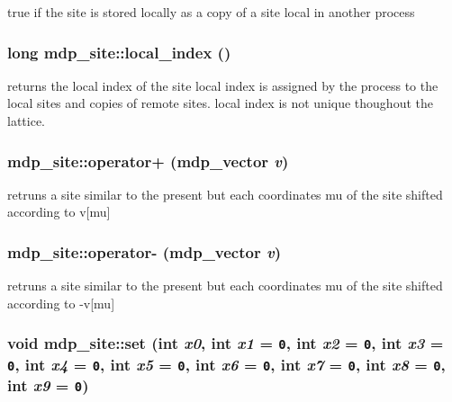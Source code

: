 true if the site is stored locally as a copy of a site local in another process \hypertarget{classmdp__site_17f0defd41f0bd2e6e744e8d82f8fcbe}{
\subsubsection[{local\_\-index}]{\setlength{\rightskip}{0pt plus 5cm}long mdp\_\-site::local\_\-index ()}}
\label{classmdp__site_17f0defd41f0bd2e6e744e8d82f8fcbe}


returns the local index of the site local index is assigned by the process to the local sites and copies of remote sites. local index is not unique thoughout the lattice. \hypertarget{classmdp__site_5fc9e1550603644416108c92cbf3cab8}{
\subsubsection[{operator+}]{ mdp\_\-site::operator+ ({\bf mdp\_\-vector} {\em v})}}
\label{classmdp__site_5fc9e1550603644416108c92cbf3cab8}


retruns a site similar to the present but each coordinates mu of the site shifted according to v\mbox{[}mu\mbox{]} \hypertarget{classmdp__site_20d26e5db480233e64bde96eb67180fc}{
\subsubsection[{operator-}]{ mdp\_\-site::operator- ({\bf mdp\_\-vector} {\em v})}}
\label{classmdp__site_20d26e5db480233e64bde96eb67180fc}


retruns a site similar to the present but each coordinates mu of the site shifted according to -v\mbox{[}mu\mbox{]} \hypertarget{classmdp__site_241eb259576cbe7354d1ff714d22416c}{
\subsubsection[{set}]{\setlength{\rightskip}{0pt plus 5cm}void mdp\_\-site::set (int {\em x0}, \/  int {\em x1} = {\tt 0}, \/  int {\em x2} = {\tt 0}, \/  int {\em x3} = {\tt 0}, \/  int {\em x4} = {\tt 0}, \/  int {\em x5} = {\tt 0}, \/  int {\em x6} = {\tt 0}, \/  int {\em x7} = {\tt 0}, \/  int {\em x8} = {\tt 0}, \/  int {\em x9} = {\tt 0})}}
\label{classmdp__site_241eb259576cbe7354d1ff714d22416c}



